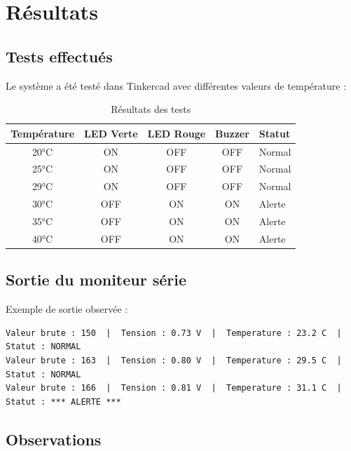 \documentclass[12pt, a4paper]{article}
\begin{document}
\section{Résultats}

\subsection{Tests effectués}

Le système a été testé dans Tinkercad avec différentes valeurs de température :

\begin{table}[H]
    \centering
    \caption{Résultats des tests}
    \begin{tabular}{ccccl}
        \toprule
        \textbf{Température} & \textbf{LED Verte} & \textbf{LED Rouge} & \textbf{Buzzer} & \textbf{Statut} \\
        \midrule
        20°C & ON  & OFF & OFF & Normal \\
        25°C & ON  & OFF & OFF & Normal \\
        29°C & ON  & OFF & OFF & Normal \\
        30°C & OFF & ON  & ON  & Alerte \\
        35°C & OFF & ON  & ON  & Alerte \\
        40°C & OFF & ON  & ON  & Alerte \\
        \bottomrule
    \end{tabular}
\end{table}

\subsection{Sortie du moniteur série}

Exemple de sortie observée :
\begin{verbatim}
Valeur brute : 150  |  Tension : 0.73 V  |  Temperature : 23.2 C  |  Statut : NORMAL
Valeur brute : 163  |  Tension : 0.80 V  |  Temperature : 29.5 C  |  Statut : NORMAL
Valeur brute : 166  |  Tension : 0.81 V  |  Temperature : 31.1 C  |  Statut : *** ALERTE ***
\end{verbatim}

\subsection{Observations}
\end{document}
